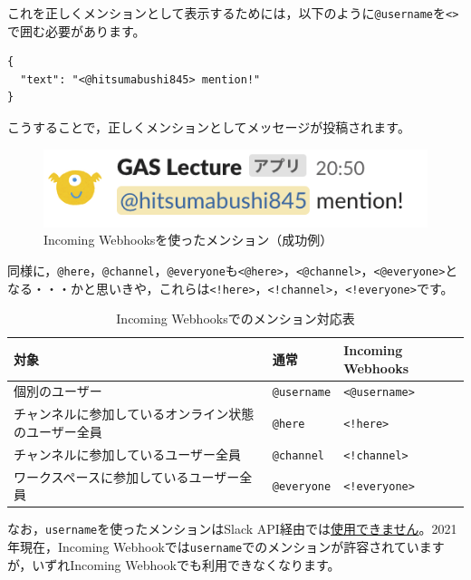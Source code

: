 \documentclass[uplatex,a4j]{jsarticle}
\begin{document}
これを正しくメンションとして表示するためには，以下のように\verb|@username|を\verb|<>|で囲む必要があります。

\begin{lstlisting}[basicstyle=\ttfamily\footnotesize,frame=single,caption=mention payload sample2,label=mrkdwnpayload]
{
  "text": "<@hitsumabushi845> mention!"
}
\end{lstlisting}

こうすることで，正しくメンションとしてメッセージが投稿されます。

\begin{figure}[H]
 \centering
 \includegraphics[keepaspectratio, scale=0.8]{images/mention2.png}
 \caption{Incoming Webhooksを使ったメンション（成功例）}
 \label{fig:mention2}
\end{figure}

同様に，\verb|@here|，\verb|@channel|，\verb|@everyone|も\verb|<@here>|，\verb|<@channel>|，\verb|<@everyone>|となる・・・かと思いきや，これらは\verb|<!here>|，\verb|<!channel>|，\verb|<!everyone>|です。

\begin{table}[H]
  \caption{Incoming Webhooksでのメンション対応表}
  \centering
  \begin{tabular}{l|ll}
対象 & 通常 & Incoming Webhooks \\ \hline
個別のユーザー & \verb|@username| & \verb|<@username>| \\
チャンネルに参加しているオンライン状態のユーザー全員 & \verb|@here| & \verb|<!here>| \\
チャンネルに参加しているユーザー全員 & \verb|@channel| & \verb|<!channel>| \\
ワークスペースに参加しているユーザー全員\footnotemark & \verb|@everyone| & \verb|<!everyone>| \\
  \end{tabular}
\end{table}


なお，\verb|username|を使ったメンションはSlack API経由では\href{https://api.slack.com/changelog/2017-09-the-one-about-usernames}{使用できません}。2021年現在，Incoming Webhookでは\verb|username|でのメンションが許容されていますが，いずれIncoming Webhookでも利用できなくなります。
\end{document}
